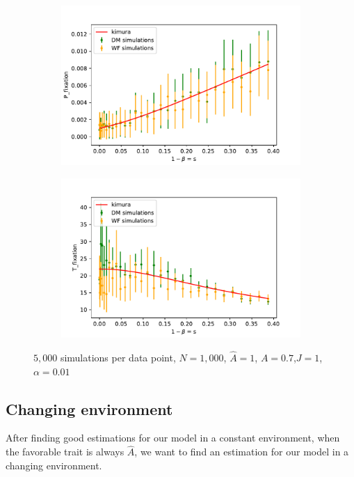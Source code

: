 \documentclass[11pt]{article}
\begin{document}
\begin{figure}[t]
  \begin{center}
  \begin{subfigure}[a]{0.49\linewidth}
    \includegraphics[width=\linewidth]{../figures/binary/fix_prob_var_beta.pdf}
   \end{subfigure}
   \begin{subfigure}[a]{0.49\linewidth}
    \includegraphics[width=\linewidth]{../figures/binary/fix_time_var_beta.pdf}
   \end{subfigure}
  \end{center}
  \caption{$5,000$ simulations per data point, $N=1,000$, $\hat{A}=1$, $A=0.7$,$J=1$,$\alpha=0.01$}
  \label{fig:var_beta}
\end{figure}

\subsection{Changing environment}
After finding good estimations for our model in a constant environment, when the favorable trait is always $\hat{A}$, we want to find an estimation for our model in a changing environment.
\end{document}
